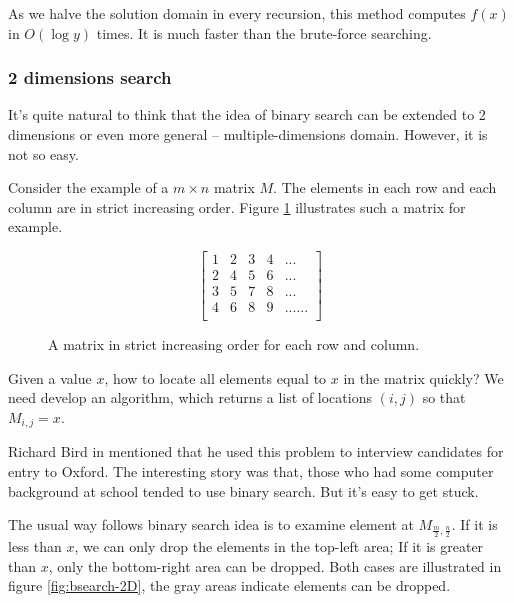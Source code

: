 \documentclass[UTF8]{article}
\begin{document}
As we halve the solution domain in every recursion, this method computes $f(x)$ in $O(\log y)$ times.
It is much faster than the brute-force searching.

\subsubsection{2 dimensions search}

It's quite natural to think that the idea of binary search can be extended to 2 dimensions or even
more general -- multiple-dimensions domain. However, it is not so easy.

Consider the example of a $m \times n$ matrix $M$. The elements in each row and
each column are in strict increasing order. Figure \ref{fig:matrix-eg} illustrates such a matrix for example.

\begin{figure}[htbp]
 \centering
\[
\left [
  \begin{array}{ccccc}
    1 & 2 & 3 & 4 & ... \\
    2 & 4 & 5 & 6 & ... \\
    3 & 5 & 7 & 8 & ... \\
    4 & 6 & 8 & 9 & ...
    ... \\
  \end{array}
\right ]
\]
\caption{A matrix in strict increasing order for each row and column.}
\label{fig:matrix-eg}
\end{figure}

Given a value $x$, how to locate all elements equal to $x$ in the matrix quickly? We need develop an algorithm,
which returns a list of locations $(i, j)$ so that $M_{i,j} = x$.

Richard Bird in \cite{fp-pearls} mentioned that he used this problem to interview candidates for entry to Oxford.
The interesting story was that, those who had some computer background at school tended to use binary search.
But it's easy to get stuck.

The usual way follows binary search idea is to examine element at $M_{\frac{m}{2}, \frac{n}{2}}$. If it is less than
$x$, we can only drop the elements in the top-left area; If it is greater than $x$, only the bottom-right area
can be dropped. Both cases are illustrated in figure \ref{fig:bsearch-2D}, the gray areas indicate elements can be dropped.
\end{document}
